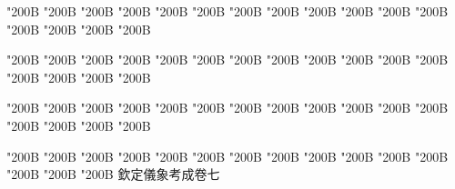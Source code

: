 \begin{正文}
\char"200B\relax{}
\char"200B\relax{}
\char"200B\relax{}
\char"200B\relax{}
\char"200B\relax{}
\char"200B\relax{}
\char"200B\relax{}
\char"200B\relax{}
\char"200B\relax{}
\char"200B\relax{}
\char"200B\relax{}
\char"200B\relax{}
\char"200B\relax{}
\char"200B\relax{}
\char"200B\relax{}
\char"200B\relax
{}\par
\end{正文}\clearpage
{}
\begin{正文}
\char"200B\relax{}
\char"200B\relax{}
\char"200B\relax{}
\char"200B\relax{}
\char"200B\relax{}
\char"200B\relax{}
\char"200B\relax{}
\char"200B\relax{}
\char"200B\relax{}
\char"200B\relax{}
\char"200B\relax{}
\char"200B\relax{}
\char"200B\relax{}
\char"200B\relax{}
\char"200B\relax{}
\char"200B\relax
{}\par
\end{正文}\clearpage
{}
\begin{正文}
\char"200B\relax{}
\char"200B\relax{}
\char"200B\relax{}
\char"200B\relax{}
\char"200B\relax{}
\char"200B\relax{}
\char"200B\relax{}
\char"200B\relax{}
\char"200B\relax{}
\char"200B\relax{}
\char"200B\relax{}
\char"200B\relax{}
\char"200B\relax{}
\char"200B\relax{}
\char"200B\relax{}
\char"200B\relax
{}\par
\end{正文}\clearpage
{}
\begin{正文}
\char"200B\relax{}
\char"200B\relax{}
\char"200B\relax{}
\char"200B\relax{}
\char"200B\relax{}
\char"200B\relax{}
\char"200B\relax{}
\char"200B\relax{}
\char"200B\relax{}
\char"200B\relax{}
\char"200B\relax{}
\char"200B\relax{}
\char"200B\relax{}
\char"200B\relax{}
\char"200B\relax{}
欽定儀象考成卷七
\par

\par\end{正文}\clearpage
